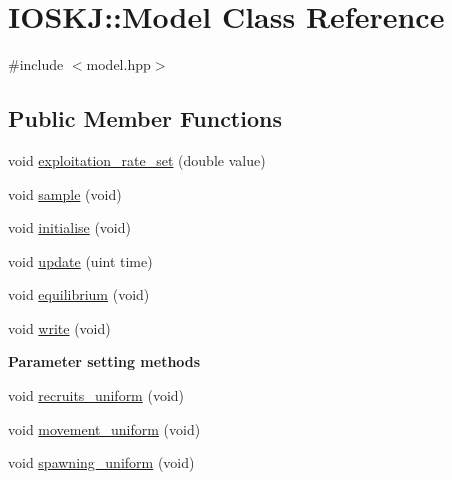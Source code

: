 \hypertarget{classIOSKJ_1_1Model}{\section{I\-O\-S\-K\-J\-:\-:Model Class Reference}
\label{classIOSKJ_1_1Model}
}


{\ttfamily \#include $<$model.\-hpp$>$}

\subsection*{Public Member Functions}
\begin{DoxyCompactItemize}
\item 
void \hyperlink{classIOSKJ_1_1Model_a6a817ac1baefd2142fe8fdd5d150d1f0}{exploitation\-\_\-rate\-\_\-set} (double value)
\item 
void \hyperlink{classIOSKJ_1_1Model_a242ba7c47871099bf4bed482d262cede}{sample} (void)
\item 
void \hyperlink{classIOSKJ_1_1Model_ae15f7b02094c380aeec9464d626705fb}{initialise} (void)
\item 
void \hyperlink{classIOSKJ_1_1Model_a5a9a40056b58e0830d7e4fbc349dd900}{update} (uint time)
\item 
void \hyperlink{classIOSKJ_1_1Model_a58e460b456d7affc4f6a8af785f6e82c}{equilibrium} (void)
\item 
void \hyperlink{classIOSKJ_1_1Model_abfc09c1b2d6bfe2802835cd5fd58c3b3}{write} (void)
\end{DoxyCompactItemize}
\begin{Indent}{\bf Parameter setting methods}\par
\begin{DoxyCompactItemize}
\item 
void \hyperlink{classIOSKJ_1_1Model_ae74437cf19859e4f38dd50b6edf958b4}{recruits\-\_\-uniform} (void)
\item 
void \hyperlink{classIOSKJ_1_1Model_a0278c3e4893f0891856dc4df93d3306f}{movement\-\_\-uniform} (void)
\item 
void \hyperlink{classIOSKJ_1_1Model_ae04fad38e291a476bec70ff67bbfd9b6}{spawning\-\_\-uniform} (void)
\end{DoxyCompactItemize}
\end{Indent}
